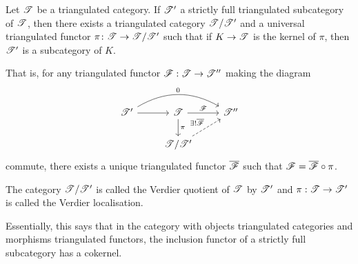 \documentclass[dissertation.tex]{subfiles}
\begin{document}
\begin{thm}[\cite{NeemanTCats}]
  Let $\mathscr{T}$ be a triangulated category.
  If $\mathscr{T}^\prime$ a strictly full triangulated subcategory of $\mathscr{T}$, then there exists a triangulated category $\mathscr{T}/\mathscr{T}^\prime$ and a universal triangulated functor $\pi \colon \mathscr{T} \rightarrow \mathscr{T}/\mathscr{T}^\prime$ such that if $K \rightarrow \mathscr{T}$ is the kernel of $\pi$, then $\mathscr{T}^\prime$ is a subcategory of $K$.

  That is, for any triangulated functor $\mathscr{F} : \mathscr{T} \rightarrow \mathscr{T}^{\prime\prime}$ making the diagram
  $$\begin{tikzcd}
    \T^\prime \arrow{r}\arrow[bend left]{rr}{0} & \T \arrow{d}{\pi}\arrow{r}{\F} & \T^{\prime\prime}\\
    & \T/\T^\prime \arrow[dashed]{ur}{\exists !\overline{\F}}
  \end{tikzcd}$$
  commute, there exists a unique triangulated functor $\overline{\mathscr{F}}$ such that $\mathscr{F} = \overline{\mathscr{F}} \circ \pi$.
  
  The category $\mathscr{T}/\mathscr{T}^\prime$ is called the Verdier quotient of $\mathscr{T}$ by $\mathscr{T}^\prime$ and $\pi : \mathscr{T} \rightarrow \mathscr{T}^\prime$ is called the Verdier localisation.
\end{thm}

\begin{rmk}
  Essentially, this says that in the category with objects triangulated categories and morphisms triangulated functors, the inclusion functor of a strictly full subcategory has a cokernel.
\end{rmk}
\end{document}
